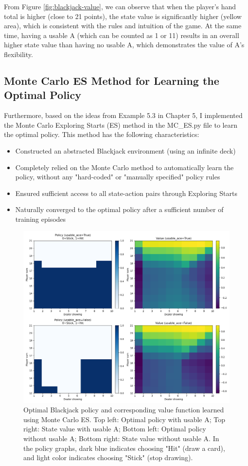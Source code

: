 \documentclass{article}
\begin{document}
From Figure \ref{fig:blackjack-value}, we can observe that when the player's hand total is higher (close to 21 points), the state value is significantly higher (yellow area), which is consistent with the rules and intuition of the game. At the same time, having a usable A (which can be counted as 1 or 11) results in an overall higher state value than having no usable A, which demonstrates the value of A's flexibility.

\subsection{Monte Carlo ES Method for Learning the Optimal Policy}

Furthermore, based on the ideas from Example 5.3 in Chapter 5, I implemented the Monte Carlo Exploring Starts (ES) method in the MC\_ES.py file to learn the optimal policy. This method has the following characteristics:

\begin{itemize}
    \item Constructed an abstracted Blackjack environment (using an infinite deck)
    \item Completely relied on the Monte Carlo method to automatically learn the policy, without any "hard-coded" or "manually specified" policy rules
    \item Ensured sufficient access to all state-action pairs through Exploring Starts
    \item Naturally converged to the optimal policy after a sufficient number of training episodes
\end{itemize}

\begin{figure}[h]
    \centering
    \includegraphics[width=\textwidth]{MC_ES.png}
    \caption{Optimal Blackjack policy and corresponding value function learned using Monte Carlo ES. Top left: Optimal policy with usable A; Top right: State value with usable A; Bottom left: Optimal policy without usable A; Bottom right: State value without usable A. In the policy graphs, dark blue indicates choosing "Hit" (draw a card), and light color indicates choosing "Stick" (stop drawing).}
    \label{fig:mc-es}
\end{figure}
\end{document}
